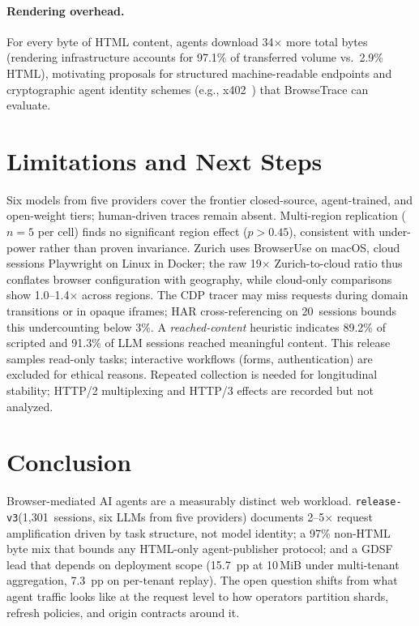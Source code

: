 \documentclass[10pt,sigconf,letterpaper,anonymous,nonacm]{acmart}
\newcommand{\sysname}{Browse\-Trace\xspace}
\newcommand{\release}{\texttt{release-v3}\xspace}
\begin{document}
\paragraph{Rendering overhead.}
For every byte of HTML content, agents download 34$\times$ more total
bytes (rendering infrastructure accounts for 97.1\% of transferred
volume vs.\ 2.9\% HTML), motivating proposals for structured
machine-readable endpoints and cryptographic agent identity schemes
(e.g., x402~\cite{x402}) that \sysname can evaluate.

\section{Limitations and Next Steps}
\label{sec:limitations}

Six models from five providers cover the frontier closed-source,
agent-trained, and open-weight tiers; human-driven traces remain
absent.  Multi-region replication ($n{=}5$ per cell) finds no
significant region effect ($p > 0.45$), consistent with under-power
rather than proven invariance.  Zurich uses BrowserUse on macOS,
cloud sessions Playwright on Linux in Docker; the raw 19$\times$
Zurich-to-cloud ratio thus conflates browser configuration with
geography, while cloud-only comparisons show 1.0--1.4$\times$ across
regions.  The CDP tracer may miss requests during domain transitions
or in opaque iframes; HAR cross-referencing on 20~sessions bounds
this undercounting below 3\%.  A \emph{reached-content} heuristic
indicates 89.2\% of scripted and 91.3\% of LLM sessions reached
meaningful content.  This release samples read-only tasks; interactive
workflows (forms, authentication) are excluded for ethical reasons.
Repeated collection
is needed for longitudinal stability; HTTP/2 multiplexing and HTTP/3
effects are recorded but not analyzed.

\section{Conclusion}
\label{sec:conclusion}

Browser-mediated AI agents are a measurably distinct web workload.
\release (1{,}301~sessions, six LLMs from five providers) documents
2--5$\times$ request amplification driven by task structure, not
model identity; a 97\% non-HTML byte mix that bounds any HTML-only
agent-publisher protocol; and a GDSF lead that depends on deployment scope (15.7~pp at
10\,MiB under multi-tenant aggregation, 7.3~pp on per-tenant
replay).  The open question shifts from what
agent traffic looks like at the request level to how operators
partition shards, refresh policies, and origin contracts around it.
\end{document}
